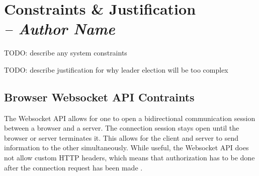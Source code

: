 \chapter{Constraints \& Justification \\
  \small{\textit{-- Author Name}}
  \label{Chapter::ConstraintsJustification}}


TODO: describe any system constraints

TODO: describe justification for why leader election will be too complex

\section{Browser Websocket API Contraints}

The Websocket API allows for one to open a bidirectional communication session between a browser and a server. The connection session stays open until the browser or server terminates it. 
This allows for the client and server to send information to the other simultaneously. While useful, the Websocket API does not allow custom HTTP headers, which means that authorization has to be done after the connection request has been made \cite{HerokuWebSocket}.